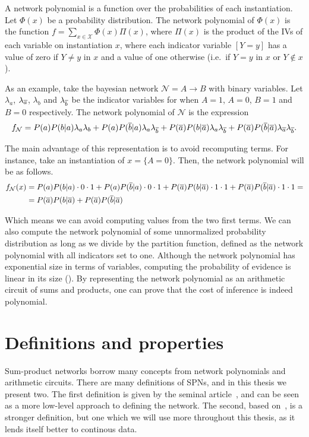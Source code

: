 A network polynomial is a function over the probabilities of each instantiation. Let $\Phi(x)$ be a
probability distribution. The network polynomial of $\Phi(x)$ is the function
$f=\sum_{x\in\mathcal{X}}\Phi(x)\Pi(x)$, where $\Pi(x)$ is the product of the IVs of each variable
on instantiation $x$, where each indicator variable $[Y=y]$ has a value of zero if $Y\neq y$ in $x$
and a value of one otherwise (i.e.\ if $Y=y$ in $x$ or $Y\not\in x$).

As an example, take the bayesian network $\mathcal{N}=A\to B$ with binary variables. Let
$\lambda_a$, $\lambda_{\overline{a}}$, $\lambda_b$ and $\lambda_{\overline{b}}$ be the indicator variables for
when $A=1$, $A=0$, $B=1$ and $B=0$ respectively. The network polynomial of $\mathcal{N}$ is the
expression
\begin{equation*}
  f_{\mathcal{N}}=P(a)P(b|a)\lambda_a\lambda_b+P(a)P(\overline{b}|a)\lambda_a\lambda_{\overline{b}}+
  P(\overline{a})P(b|\overline{a})\lambda_a\lambda_{\overline{b}}+P(\overline{a})P(\overline{b}|\overline{a})\lambda_{\overline{a}}
  \lambda_{\overline{b}}.
\end{equation*}

The main advantage of this representation is to avoid recomputing terms. For instance, take an
instantiation of $x=\{A=0\}$. Then, the network polynomial will be as follows.
\begin{align*}
  f_{\mathcal{N}}(x)&=P(a)P(b|a)\cdot 0\cdot 1+P(a)P(\overline{b}|a)\cdot 0\cdot
  1+P(\overline{a})P(b|\overline{a})\cdot 1\cdot 1+P(\overline{a})P(\overline{b}|\overline{a})\cdot 1\cdot 1=\\
  &=P(\overline{a})P(b|\overline{a})+P(\overline{a})P(\overline{b}|\overline{a})
\end{align*}

Which means we can avoid computing values from the two first terms. We can also compute the network
polynomial of some unnormalized probability distribution as long as we divide by the partition
function, defined as the network polynomial with all indicators set to one. Although the network
polynomial has exponential size in terms of variables, computing the probability of evidence is
linear in its size (\cite{diff-approach-darwiche}). By representing the network polynomial as an
arithmetic circuit of sums and products, one can prove that the cost of inference is indeed
polynomial.

\section{Definitions and properties}

Sum-product networks borrow many concepts from network polynomials and arithmetic circuits. There
are many definitions of SPNs, and in this thesis we present two. The first definition is given by
the seminal article~\cite{poon-domingos}, and can be seen as a more low-level approach to defining
the network\@. The second, based on~\cite{gens-domingos}, is a stronger definition, but one which
we will use more throughout this thesis, as it lends itself better to continous data.

